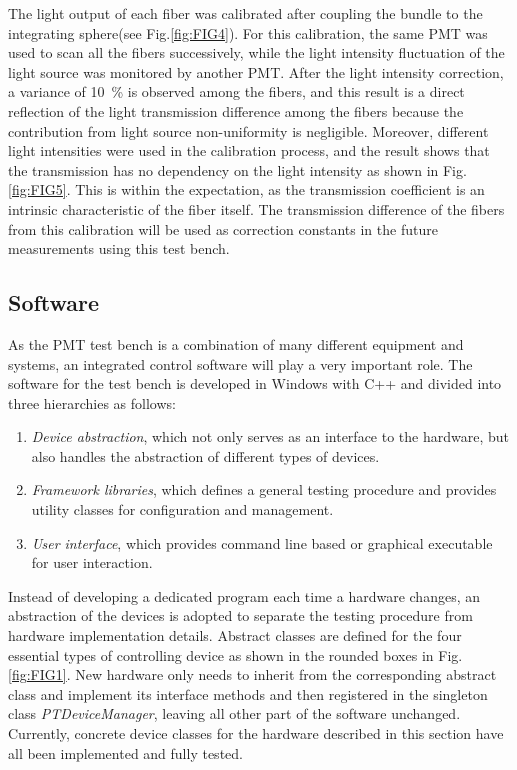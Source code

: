 \documentclass[review, times]{elsarticle}
\begin{document}
The light output of each fiber was calibrated after coupling the bundle to the integrating sphere(see Fig.\ref{fig:FIG4}).
For this calibration, the same PMT was used to scan all the fibers successively, while the light intensity fluctuation of the light source was monitored by another PMT.
After the light intensity correction, a variance of \SI{10}{\percent} is observed among the fibers, and this result is a direct reflection of the light transmission difference among the fibers because the contribution from light source non-uniformity is negligible.
Moreover, different light intensities were used in the calibration process, and the result shows that the transmission has no dependency on the light intensity as shown in Fig.\ref{fig:FIG5}. 
This is within the expectation, as the transmission coefficient is an intrinsic characteristic of the fiber itself.
The transmission difference of the fibers from this calibration will be used as correction constants in the future measurements using this test bench.

\subsection{Software}
\label{sec:software}

As the PMT test bench is a combination of many different equipment and systems, an integrated control software will play a very important role. The software for the test bench is developed in Windows with C++ and divided into three hierarchies as follows:
\begin{enumerate}
 \item \textit{Device abstraction}, which not only serves as an interface to the hardware, but also handles the abstraction of different types of devices. 
 \item \textit{Framework libraries}, which defines a general testing procedure and provides utility classes for configuration and management.
 \item \textit{User interface}, which provides command line based or graphical executable for user interaction. 
\end{enumerate}

Instead of developing a dedicated program each time a hardware changes, an abstraction of the devices is adopted to separate the testing procedure from hardware implementation details. 
Abstract classes are defined for the four essential types of controlling device as shown in the rounded boxes in Fig.\ref{fig:FIG1}.
New hardware only needs to inherit from the corresponding abstract class and implement its interface methods and then registered in the singleton class \textit{PTDeviceManager}, leaving all other part of the software unchanged.
Currently, concrete device classes for the hardware described in this section have all been implemented and fully tested.
\end{document}
